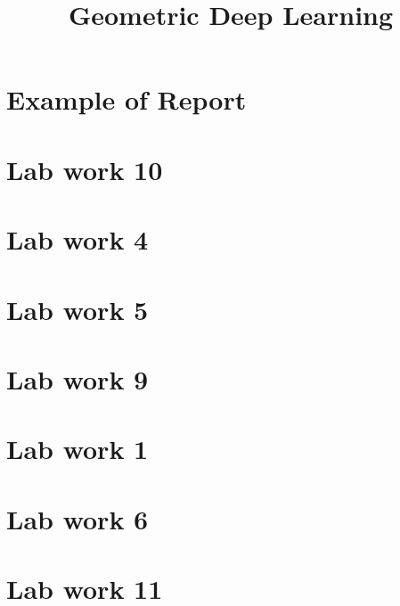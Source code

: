 \documentclass[a4paper,14pt]{article}
\title{Geometric Deep Learning}
\date{}
\numberwithin{equation}{section}
\begin{document}
    \maketitle
    \tableofcontents

    \clearpage
    \section{Example of Report} %
    {} %

    \clearpage
    \section{Lab work 10} %
    {} %

    \clearpage
    \section{Lab work 4} %
    {} %

    \clearpage
    \section{Lab work 5} %
    {} %

    \clearpage
    \section{Lab work 9} %
    {} %

    \clearpage
    \section{Lab work 1} %
    {} %

    \clearpage
    \section{Lab work 6} %
    {} %

    \clearpage
    \section{Lab work 11} %
    {} %

    \clearpage
    \printbibliography
\end{document}
